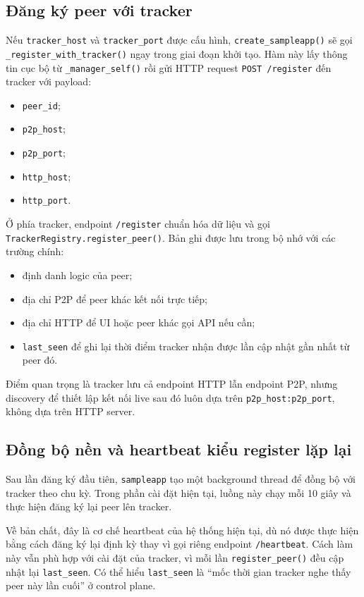 \subsection{Đăng ký peer với tracker}
Nếu \texttt{tracker\_host} và \texttt{tracker\_port} được cấu hình, \texttt{create\_sampleapp()} sẽ gọi \texttt{\_register\_with\_tracker()} ngay trong giai đoạn khởi tạo. Hàm này lấy thông tin cục bộ từ \texttt{\_manager\_self()} rồi gửi HTTP request \texttt{POST /register} đến tracker với payload:
\begin{itemize}[leftmargin=2em]
    \item \texttt{peer\_id};
    \item \texttt{p2p\_host};
    \item \texttt{p2p\_port};
    \item \texttt{http\_host};
    \item \texttt{http\_port}.
\end{itemize}

Ở phía tracker, endpoint \texttt{/register} chuẩn hóa dữ liệu và gọi \texttt{TrackerRegistry.register\_peer()}. Bản ghi được lưu trong bộ nhớ với các trường chính:
\begin{itemize}[leftmargin=2em]
    \item định danh logic của peer;
    \item địa chỉ P2P để peer khác kết nối trực tiếp;
    \item địa chỉ HTTP để UI hoặc peer khác gọi API nếu cần;
    \item \texttt{last\_seen} để ghi lại thời điểm tracker nhận được lần cập nhật gần nhất từ peer đó.
\end{itemize}

Điểm quan trọng là tracker lưu cả endpoint HTTP lẫn endpoint P2P, nhưng discovery để thiết lập kết nối live sau đó luôn dựa trên \texttt{p2p\_host:p2p\_port}, không dựa trên HTTP server.

\subsection{Đồng bộ nền và heartbeat kiểu register lặp lại}
Sau lần đăng ký đầu tiên, \texttt{sampleapp} tạo một background thread để đồng bộ với tracker theo chu kỳ. Trong phần cài đặt hiện tại, luồng này chạy mỗi 10 giây và thực hiện đăng ký lại peer lên tracker.

Về bản chất, đây là cơ chế heartbeat của hệ thống hiện tại, dù nó được thực hiện bằng cách đăng ký lại định kỳ thay vì gọi riêng endpoint \texttt{/heartbeat}. Cách làm này vẫn phù hợp với cài đặt của tracker, vì mỗi lần \texttt{register\_peer()} đều cập nhật lại \texttt{last\_seen}. Có thể hiểu \texttt{last\_seen} là ``mốc thời gian tracker nghe thấy peer này lần cuối'' ở control plane.

